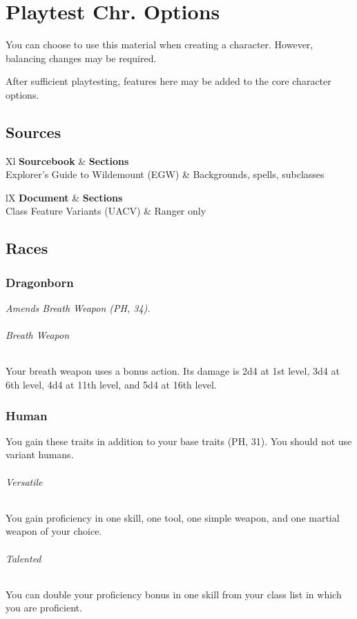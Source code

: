 \documentclass[House_Rules.tex]{subfiles}
\begin{document}
\chapter{Playtest Chr. Options}

You can choose to use this material when creating a character. However, balancing changes may be required. 

After sufficient playtesting, features here may be added to the core character options.




\section{Sources}

\begin{DndTable}[]{Xl}
    \textbf{Sourcebook} & \textbf{Sections} \\
    Explorer's Guide to Wildemount (EGW) & Backgrounds, spells, subclasses \\
\end{DndTable}

\begin{DndTable}[header=Unearthed Arcana]{lX}
    \textbf{Document} & \textbf{Sections} \\
    Class Feature Variants (UACV) & Ranger only \\
\end{DndTable}




\section{Races}

\subsection{Dragonborn}
\textit{Amends Breath Weapon (PH, 34).}

\subparagraph{Breath Weapon} Your breath weapon uses a bonus action. Its damage is 2d4 at 1st level, 3d4 at 6th level, 4d4 at 11th level, and 5d4 at 16th level.

\subsection{Human}

You gain these traits in addition to your base traits (PH, 31). You should not use variant humans.

\subparagraph{Versatile} You gain proficiency in one skill, one tool, one simple weapon, and one martial weapon of your choice.
\subparagraph{Talented} You can double your proficiency bonus in one skill from your class list in which you are proficient.
\end{document}
